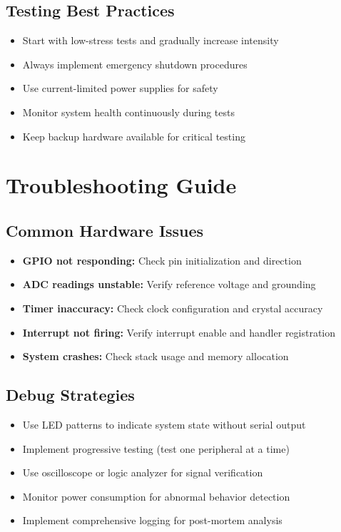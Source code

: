 \documentclass[11pt,a4paper]{article}
\begin{document}
\subsection{Testing Best Practices}
\begin{itemize}
    \item Start with low-stress tests and gradually increase intensity
    \item Always implement emergency shutdown procedures
    \item Use current-limited power supplies for safety
    \item Monitor system health continuously during tests
    \item Keep backup hardware available for critical testing
\end{itemize}

\section{Troubleshooting Guide}

\subsection{Common Hardware Issues}
\begin{itemize}
    \item \textbf{GPIO not responding:} Check pin initialization and direction
    \item \textbf{ADC readings unstable:} Verify reference voltage and grounding
    \item \textbf{Timer inaccuracy:} Check clock configuration and crystal accuracy
    \item \textbf{Interrupt not firing:} Verify interrupt enable and handler registration
    \item \textbf{System crashes:} Check stack usage and memory allocation
\end{itemize}

\subsection{Debug Strategies}
\begin{itemize}
    \item Use LED patterns to indicate system state without serial output
    \item Implement progressive testing (test one peripheral at a time)
    \item Use oscilloscope or logic analyzer for signal verification
    \item Monitor power consumption for abnormal behavior detection
    \item Implement comprehensive logging for post-mortem analysis
\end{itemize}
\end{document}
